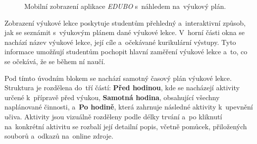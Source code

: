 \documentclass[male,czech,api_bc]{kitheses}
\begin{document}
\begin{figure}[H]
	\centering
	\caption{Mobilní zobrazení aplikace \textit{EDUBO} s~náhledem na~výukový plán.}
	\label{fig:edubo-7}
\end{figure}

Zobrazení výukové lekce poskytuje studentům přehledný a~interaktivní způsob, jak se seznámit s~výukovým plánem dané výukové lekce. V~horní části okna se nachází název výukové lekce, její cíle a~očekávané kurikulární výstupy. Tyto informace umožňují studentům pochopit hlavní zaměření výukové lekce a~to, co se očekává, že se během ní naučí.

Pod tímto úvodním blokem se nachází samotný časový plán výukové lekce. Struktura je rozdělena do~tří částí: \textbf{Před hodinou}, kde se nacházejí aktivity určené k~přípravě před výukou, \textbf{Samotná hodina}, obsahující všechny naplánované činnosti, a~\textbf{Po hodině}, která zahrnuje následné aktivity k~upevnění učiva. Aktivity jsou vizuálně rozděleny podle délky trvání a~po kliknutí na~konkrétní aktivitu se rozbalí její detailní popis, včetně pomůcek, přiložených souborů a~odkazů na~online zdroje.
\end{document}
